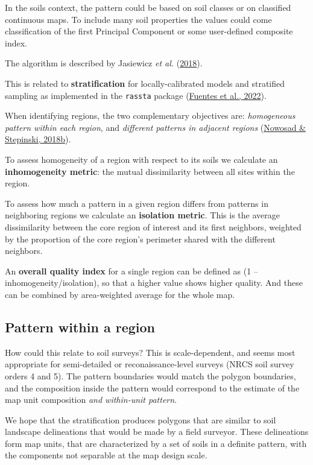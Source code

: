 \documentclass[
  letterpaper,
  DIV=11,
  numbers=noendperiod]{scrartcl}
\begin{document}
In the soils context, the pattern could be based on soil classes or on
classified continuous maps. To include many soil properties the values
could come classification of the first Principal Component or some
user-defined composite index.

The algorithm is described by Jasiewicz \emph{et al.}
(\protect\hyperlink{ref-jasiewiczMultiscaleSegmentationAlgorithm2018}{2018}).

This is related to \textbf{stratification} for locally-calibrated models
and stratified sampling as implemented in the \texttt{rassta} package
(\protect\hyperlink{ref-fuentesRasstaRasterBasedSpatial2022}{Fuentes et
al., 2022}).

When identifying regions, the two complementary objectives are:
\emph{homogeneous pattern within each region}, and \emph{different
patterns in adjacent regions}
(\protect\hyperlink{ref-nowosadMachineEcoregionalizationEarth2018}{Nowosad
\& Stepinski, 2018b}).

To assess homogeneity of a region with respect to its soils we calculate
an \textbf{inhomogeneity metric}: the mutual dissimilarity between all
sites within the region.

To assess how much a pattern in a given region differs from patterns in
neighboring regions we calculate an \textbf{isolation metric}. This is
the average dissimilarity between the core region of interest and its
first neighbors, weighted by the proportion of the core region's
perimeter shared with the different neighbors.

An \textbf{overall quality index} for a single region can be defined as
(1 -- inhomogeneity/isolation), so that a higher value shows higher
quality. And these can be combined by area-weighted average for the
whole map.

\hypertarget{pattern-within-a-region}{%
\subsection{Pattern within a region}\label{pattern-within-a-region}}

How could this relate to soil surveys? This is scale-dependent, and
seems most appropriate for semi-detailed or reconaissance-level surveys
(NRCS soil survey orders 4 and 5). The pattern boundaries would match
the polygon boundaries, and the composition inside the pattern would
correspond to the estimate of the map unit composition \emph{and
within-unit pattern}.

We hope that the stratification produces polygons that are similar to
soil landscape delineations that would be made by a field surveyor.
These delineations form map units, that are characterized by a set of
soils in a definite pattern, with the components not separable at the
map design scale.
\end{document}

